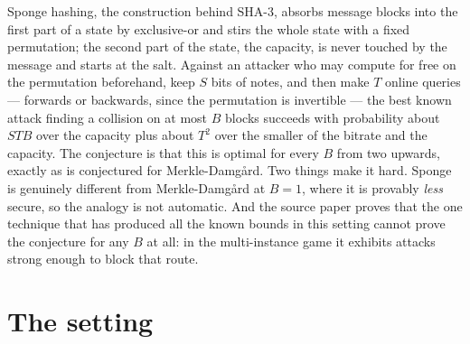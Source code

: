 \documentclass{aicr-conjecture}
\begin{document}

\vspace{0.4em}

\begin{informalconjecture}
Sponge hashing, the construction behind SHA-3, absorbs message blocks
into the first part of a state by exclusive-or and stirs the whole
state with a fixed permutation; the second part of the state, the
capacity, is never touched by the message and starts at the salt.
Against an attacker who may compute for free on the permutation
beforehand, keep $S$ bits of notes, and then make $T$ online queries
--- forwards or backwards, since the permutation is invertible --- the
best known attack finding a collision on at most $B$ blocks succeeds
with probability about $STB$ over the capacity plus about $T^{2}$ over
the smaller of the bitrate and the capacity. The conjecture is that
this is optimal for every $B$ from two upwards, exactly as is
conjectured for Merkle-Damg\aa{}rd. Two things make it hard. Sponge is
genuinely different from Merkle-Damg\aa{}rd at $B = 1$, where it is
provably \emph{less} secure, so the analogy is not automatic. And the
source paper proves that the one technique that has produced all the
known bounds in this setting cannot prove the conjecture for any $B$ at
all: in the multi-instance game it exhibits attacks strong enough to
block that route.
\end{informalconjecture}

\section{The setting}\label{sec:setting}
\end{document}
